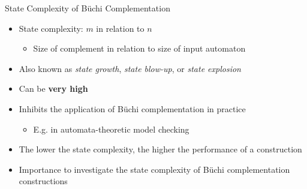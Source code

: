 \documentclass[12pt]{beamer}
\newcommand{\fat}[1]{\textbf{#1}}
\newcommand{\ita}[1]{\textit{#1}}
\begin{document}
\begin{frame}{State Complexity of Büchi Complementation}
\centering
{}
\begin{itemize}
\item State complexity: $m$ in relation to $n$
  \begin{itemize}
  \item Size of complement in relation to size of input automaton
  \end{itemize}
\pause
\item Also known as \ita{state growth}, \ita{state blow-up}, or \ita{state explosion}
\pause
\item Can be \fat{very high}
\item Inhibits the application of Büchi complementation in practice
  \begin{itemize}
  \item E.g. in automata-theoretic model checking
  \end{itemize}
\pause
\item The lower the state complexity, the higher the performance of a construction
\item Importance to investigate the state complexity of Büchi complementation constructions
\end{itemize}
\end{frame}
\end{document}
